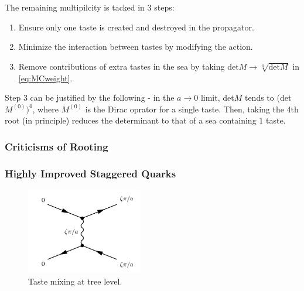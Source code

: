 \documentclass[a4paper,10pt]{article}
\numberwithin{equation}{section}
\begin{document}
\\ \\
The remaining multipilcity is tacked in 3 steps:
\begin{enumerate}
	\item
	Ensure only one taste is created and destroyed in the propagator.
	\item
	Minimize the interaction between tastes by modifying the action.
	\item
	Remove contributions of extra tastes in the sea by taking det$M \to \sqrt[4]{\text{det}M}$ in \eqref{eq:MCweight}.
\end{enumerate}
Step 3 can be justified by the following - in the $a\to 0$ limit, det$M$ tends to (det$M^{(0)})^4$, where $M^{(0)}$ is the Dirac oprator for a single taste. Then, taking the 4th root (in principle) reduces the determinant to that of a sea containing 1 taste.

\subsubsection{Criticisms of Rooting}

\subsubsection{Highly Improved Staggered Quarks}

\begin{figure}
  \begin{center}
    \includegraphics[width=
   0.45\textwidth]{tastemixing.jpg}
  \end{center}
  \caption{Taste mixing at tree level.}
  \label{fig:tastemixing}
\end{figure}
\end{document}
